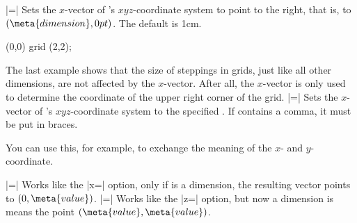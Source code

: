 \begin{itemize}
|=|
  Sets the $x$-vector of \pgfname's $xyz$-coordinate system to point
   to the right, that is, to
  $(\meta{dimension},0pt)$. The default is 1cm.

\begin{codeexample}[]
\end{codeexample}    

\begin{codeexample}[]
\tikz \draw[x=1.5cm] (0,0) grid (2,2);
\end{codeexample}    

The last example shows that the size of steppings in grids, just like
all other dimensions, are not affected by the $x$-vector. After all,
the $x$-vector is only used to determine the coordinate of the upper
right corner of the grid.
|=|
  Sets the $x$-vector of \pgfname's $xyz$-coordinate system to the
  specified . If  contains a comma,
  it must be put in braces. 

\begin{codeexample}[]
\end{codeexample}

  You can use this, for example, to exchange the meaning of the $x$- and
  $y$-coordinate.

\begin{codeexample}[]
\end{codeexample}

|=|
  Works like the |x=| option, only if  is a dimension, the
  resulting vector points to $(0,\meta{value})$.
|=|
  Works like the |z=| option, but now a dimension is means the point
  $(\meta{value},\meta{value})$.

\begin{codeexample}[]
\end{codeexample}
\end{itemize}



